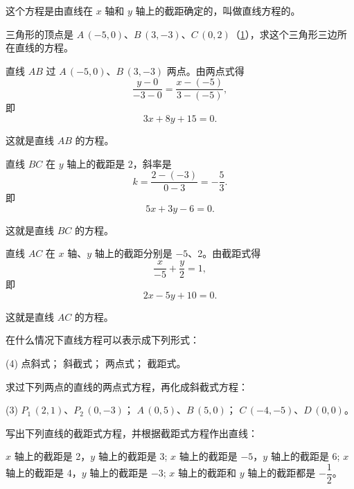 这个方程是由直线在 $x$ 轴和 $y$ 轴上的截距确定的，叫做直线方程的。
\begin{example}
  三角形的顶点是 $A\,(-5,0)$、$B\,(3,-3)$、$C\,(0,2)$（\cref{fig:1-22}），求这个三角形三边所在直线的方程。
\end{example}
\begin{solution}
  直线 $AB$ 过 $A\,(-5,0)$、$B\,(3,-3)$ 两点。由两点式得
  \[ \frac{y-0}{-3-0}=\frac{x-(-5)}{3-(-5)},\]
  即
  \[ 3x + 8y + 15 = 0 .\]

  这就是直线 $AB$ 的方程。

  直线 $BC$ 在 $y$ 轴上的截距是 2，斜率是
  \[ k=\frac{2-(-3)}{0-3}=-\frac{5}{3}. \]
  即
  \[ 5x + 3y - 6 = 0 .\]

  这就是直线 $BC$ 的方程。

  直线 $AC$ 在 $x$ 轴、$y$ 轴上的截距分别是 $-5$、2。由截距式得
  \[ \frac{x}{-5} + \frac{y}{2} = 1,\]
  即
  \[ 2x - 5y + 10 = 0 .\]

  这就是直线 $AC$ 的方程。
\end{solution}
\begin{figure}
  \caption{}\label{fig:1-22}
\end{figure}

\begin{Practice}
  \begin{question}
    \item 在什么情况下直线方程可以表示成下列形式：
    \begin{tasks}(4)
      \task 点斜式；
      \task 斜截式；
      \task 两点式；
      \task 截距式。
    \end{tasks}
    \item 求过下列两点的直线的两点式方程，再化成斜截式方程：
    \begin{tasks}(3)
      \task $P_1\,(2,1)$、$P_2\,(0,-3)$；
      \task $A\,(0,5)$、$B\,(5,0)$；
      \task $C\,(-4,-5)$、$D\,(0,0)$。
    \end{tasks}
    \item 写出下列直线的截距式方程，并根据截距式方程作出直线：
    \begin{tasks}
      \task $x$ 轴上的截距是 2，$y$ 轴上的截距是 3;
      \task $x$ 轴上的截距是 $-5$，$y$ 轴上的截距是 6;
      \task $x$ 轴上的截距是 4，$y$ 轴上的截距是 $-3$;
      \task $x$ 轴上的截距和 $y$ 轴上的截距都是 $-\dfrac{1}{2}$。
    \end{tasks}
  \end{question}
\end{Practice}

